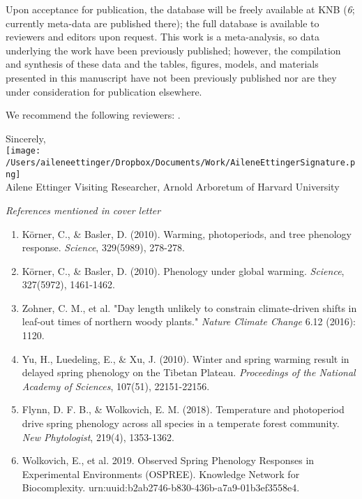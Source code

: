 \documentclass[11pt,a4paper]{letter}
\begin{document}
\begin{letter}{}
\par Upon acceptance for publication, the database will be freely available at KNB (\emph{6}; currently meta-data are published there); the full database is available to reviewers and editors upon request. This work is a meta-analysis, so data underlying the work have been previously published; however, the compilation and synthesis of these data and the tables, figures, models, and materials presented in this manuscript have not been previously published nor are they under consideration for publication elsewhere.

We recommend the following reviewers: .%


Sincerely,\\

\texttt{[image: /Users/aileneettinger/Dropbox/Documents/Work/AileneEttingerSignature.png]} \\
Ailene Ettinger
Visiting Researcher, Arnold Arboretum of Harvard University 

\noindent \emph{References mentioned in cover letter}
\begin{footnotesize}
\begin{enumerate}
\item K\"orner, C., \& Basler, D. (2010). Warming, photoperiods, and tree phenology response. \emph{Science}, 329(5989), 278-278.
\item K\"orner, C., \& Basler, D. (2010). Phenology under global warming. \emph{Science}, 327(5972), 1461-1462.
\item Zohner, C. M., et al. "Day length unlikely to constrain climate-driven shifts in leaf-out times of northern woody plants." \emph{Nature Climate Change} 6.12 (2016): 1120.
\item Yu, H., Luedeling, E., \& Xu, J. (2010). Winter and spring warming result in delayed spring phenology on the Tibetan Plateau. \emph{Proceedings of the National Academy of Sciences}, 107(51), 22151-22156.
\item Flynn, D. F. B., \& Wolkovich, E. M. (2018). Temperature and photoperiod drive spring phenology across all species in a temperate forest community. \emph{New Phytologist}, 219(4), 1353-1362.
\item Wolkovich, E., et al. 2019. Observed Spring Phenology Responses in Experimental Environments (OSPREE). Knowledge Network for Biocomplexity. urn:uuid:b2ab2746-b830-436b-a7a9-01b3ef3558e4. 
\end{enumerate}
\end{footnotesize}



\end{letter}
\end{document}
